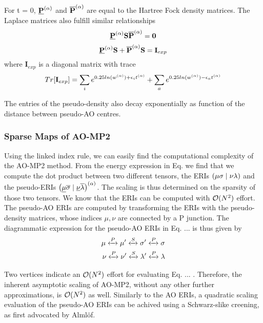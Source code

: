 \noindent For t = 0, $\underline{\mathbf{P}}^{(\alpha)}$ and $\overline{\mathbf{P}}^{(\alpha)}$ are equal to the Hartree Fock density matrices. The Laplace matrices also fulfill similar relationships
\begin{equation}
\underline{\mathbf{P}}^{(\alpha)} \mathbf{S} \overline{\mathbf{P}}^{(\alpha)} = \mathbf{0}
\end{equation}
\begin{equation}
\underline{\mathbf{P}}^{(\alpha)} \mathbf{S} + \overline{\mathbf{P}}^{(\alpha)} \mathbf{S} = \mathbf{I}_{exp}
\end{equation}
\noindent where $\mathbf{I}_{exp}$ is a diagonal matrix with trace
\begin{equation}
Tr[\mathbf{I}_{exp}] = \sum_i e^{0.25 ln(w^{(\alpha)}) + \epsilon_i t^{(\alpha)}} + \sum_a e^{0.25 ln(w^{(\alpha)}) - \epsilon_a t^{(\alpha)}}
\end{equation}

The entries of the pseudo-density also decay exponentially as function of the distance between pseudo-AO centres. 

\subsubsection{Sparse Maps of AO-MP2}

Using the linked index rule, we can easily find the computational complexity of the AO-MP2 method. From the energy expression in Eq. we find that we compute the dot product between two different tensors, the ERIs $\left( \mu\sigma \mid \nu\lambda \right)$ and the pseudo-ERIs $\left( \underline{\mu}\overline{\sigma} \mid \underline{\nu}\overline{\lambda} \right)^{(\alpha)}$. The scaling is thus determined on the sparsity of those two tensors. We know that the ERIs can be computed with $\mathcal{O}(N^{2})$ effort. The pseudo-AO ERIs are computed by transforming the ERIs with the pseudo-density matrices, whose indices $\mu,\nu$ are connected by a P junction. The diagrammatic expression for the pseudo-AO ERIs in Eq. ... is thus given by
\begin{equation}
\begin{split}
\mu \xleftrightarrow{P} \mu' \xleftrightarrow{S} \sigma' \xleftrightarrow{P} \sigma \\
\nu \xleftrightarrow{P} \nu' \xleftrightarrow{S} \lambda' \xleftrightarrow{P} \lambda
\end{split}
\end{equation}

\noindent Two vertices indicate an $\mathcal{O}(N^{2})$ effort for evaluating Eq. ... . Therefore, the inherent asymptotic scaling of AO-MP2, without any other further approximations, is $\mathcal{O}(N^{2})$ as well. Similarly to the AO ERIs, a quadratic scaling evaluation of the pseudo-AO ERIs can be achived using a Schwarz-slike creening, as first advocated by Almlöf.   


